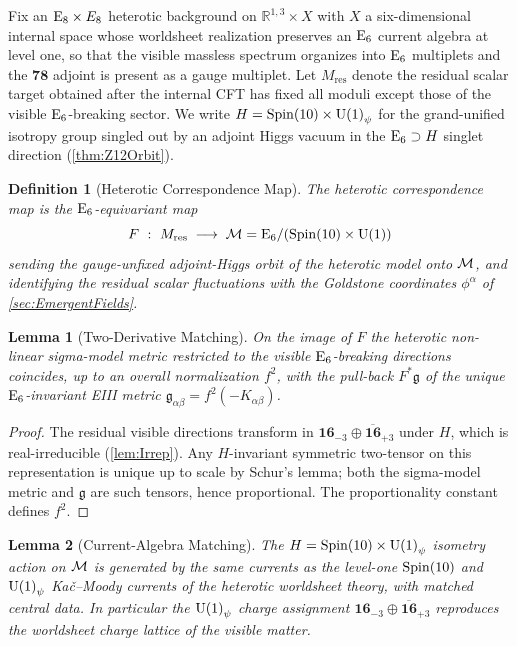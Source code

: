 \documentclass[pdflatex,sn-mathphys-num]{sn-jnl}
\theoremstyle{thmstyleone}
\newtheorem{lemma}[lemma]{Lemma}
\theoremstyle{thmstylethree}%
\newtheorem{definition}[definition]{Definition}
\theoremstyle{thmstyletwo}%
\begin{document}
Fix an $\mathrm{E}_{8}\times E_{8}$ heterotic background on
$\mathbb R^{1,3}\times X$ with $X$ a six-dimensional internal space whose
worldsheet realization preserves an $\mathrm{E}_{6}$ current algebra at level one, so
that the visible massless spectrum organizes into $\mathrm{E}_{6}$ multiplets and the
$\mathbf{78}$ adjoint is present as a gauge multiplet. Let $M_{\mathrm{res}}$ denote the
residual scalar target obtained after the internal CFT has fixed all moduli
except those of the visible $\mathrm{E}_{6}$-breaking sector.  We write $H=\operatorname{Spin}(10) \times \mathrm{U(1)}_\psi$
for the grand-unified isotropy group singled out by an adjoint Higgs vacuum in
the $\mathrm{E}_{6}\supset H$ singlet direction (\autoref{thm:Z12Orbit}).

\begin{definition}[Heterotic Correspondence Map]
\label{def:Interface}
The \emph{heterotic correspondence map} is the $\mathrm{E}_{6}$-equivariant map
\[
  F\ :\ M_{\mathrm{res}}\;\longrightarrow\;\M=\MCosetInline
\]
sending the gauge-unfixed adjoint-Higgs orbit of the heterotic model onto
$\mathcal{M}$, and identifying the residual scalar fluctuations with the
Goldstone coordinates $\phi^{\alpha}$ of \autoref{sec:EmergentFields}.
\end{definition}

\begin{lemma}[Two-Derivative Matching]
\label{lem:TwoDerivative}
On the image of $F$ the heterotic non-linear sigma-model metric restricted to the
visible $\mathrm{E}_{6}$-breaking directions coincides, up to an overall normalization
$f^{2}$, with the pull-back $F^{\ast}\mathfrak g$ of the unique
$\mathrm{E}_{6}$-invariant EIII metric $\mathfrak g_{\alpha\beta}=f^{2}(-K_{\alpha\beta})$.
\end{lemma}

\begin{proof}
The residual visible directions transform in
$\mathbf{16}_{-3}\oplus\overline{\mathbf{16}}_{+3}$
under $H$, which is real-irreducible (\autoref{lem:Irrep}).  Any
$H$-invariant symmetric two-tensor on this representation is unique up to scale
by Schur's lemma; both the sigma-model metric and $\mathfrak g$ are such
tensors, hence proportional.  The proportionality constant defines
$f^{2}$.
\end{proof}

\begin{lemma}[Current-Algebra Matching]
\label{lem:Current}
The $H=\operatorname{Spin}(10) \times \mathrm{U(1)}_\psi$ isometry action on $\mathcal{M}$ is generated by the same
currents as the level-one $\operatorname{Spin}(10)$ and $\mathrm{U(1)}_\psi$ Ka\v{c}--Moody currents of
the heterotic worldsheet theory, with matched central data.  In particular the
$\mathrm{U(1)}_\psi$ charge assignment
$\mathbf{16}_{-3}\oplus\overline{\mathbf{16}}_{+3}$ reproduces the worldsheet
charge lattice of the visible matter.
\end{lemma}
\end{document}
